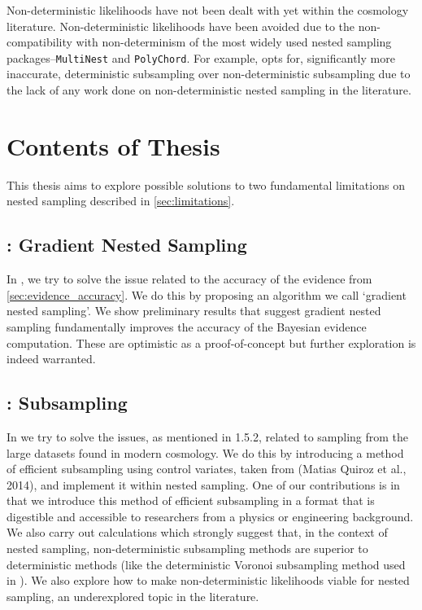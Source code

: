 Non-deterministic likelihoods have not been dealt with yet within the cosmology literature. Non-deterministic likelihoods have been avoided due to the non-compatibility with non-determinism of the most widely used nested sampling packages--\texttt{MultiNest} and \texttt{PolyChord}. For example, \cite{Mihaylov_2020} opts for, significantly more inaccurate, deterministic subsampling over non-deterministic subsampling due to the lack of any work done on non-deterministic nested sampling in the literature.

\section{Contents of Thesis}

This thesis aims to explore possible solutions to two fundamental limitations on nested sampling described in \cref{sec:limitations}.


\subsection*{: Gradient Nested Sampling}


In , we try to solve the issue related to the accuracy of the evidence from \cref{sec:evidence_accuracy}. We do this by proposing an algorithm we call `gradient nested sampling'. We show preliminary results that suggest gradient nested sampling fundamentally improves the accuracy of the Bayesian evidence computation. These are optimistic as a proof-of-concept but further exploration is indeed warranted.

\subsection*{: Subsampling}

In  we try to solve the issues, as mentioned in 1.5.2, related to sampling from the large datasets found in modern cosmology. We do this by introducing a method of efficient subsampling using control variates, taken from \cite{Quiroz_2018} (Matias Quiroz et al., 2014), and implement it within nested sampling. One of our contributions is in that we introduce this method of efficient subsampling in a format that is digestible and accessible to researchers from a physics or engineering background. We also carry out calculations which strongly suggest that, in the context of nested sampling, non-deterministic subsampling methods are superior to deterministic methods (like the deterministic Voronoi subsampling method used in \cite{Mihaylov_2020}). We also explore how to make non-deterministic likelihoods viable for nested sampling, an underexplored topic in the literature.

